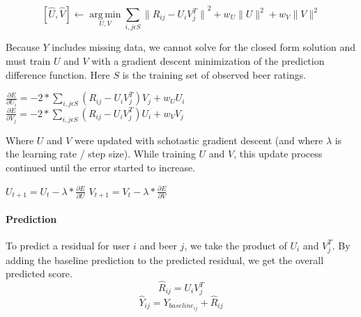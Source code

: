 \documentclass[12pt]{article}
\DeclareMathOperator*{\argmin}{arg\,min}
\begin{document}
$$ [\hat{U}, \hat{V}] \leftarrow \argmin\limits_{U,V}\sum\limits_{i,j \epsilon S} {\|R_{ij} - U_i V_j^T\|}^2 + w_U\|U\|^2 + w_V\|V\|^2$$

Because $Y$ includes missing data, we cannot solve for the closed form solution and must train $U$ and $V$ with a gradient descent minimization of the prediction difference function. Here $S$ is the training set of observed beer ratings. \\

\begin{center}
$ \frac{\partial E}{\partial U_i} = -2 * \sum\limits_{i,j \epsilon S} (R_{ij} - U_i V_j^T) V_j + w_U U_i $ \hspace{1cm} $ \frac{\partial E}{\partial V_j} = -2 * \sum\limits_{i,j \epsilon S} (R_{ij} - U_i V_j^T) U_i + w_V V_j$\\
\end{center}




Where $U$ and $V$ were updated with schotastic gradient descent (and where $\lambda$ is the learning rate / step size). While training $U$ and $V$, this update process continued until the error started to increase.
\begin{center}
$ U_{t+1} = U_t - \lambda * \frac{\partial E}{\partial U}$ \hspace{2cm} $V_{t+1} = V_t - \lambda * \frac{\partial E}{\partial V}$
\end{center}
\paragraph{Prediction} To predict a residual for user $i$ and beer $j$, we take the product of $U_i$ and $V_j^T$. By adding the baseline prediction to the predicted residual, we get the overall predicted score.
$$ \hat{R}_{ij} = U_i V_j^T $$
$$ \hat{Y}_{ij} = Y_{baseline_{ij}} + \hat{R}_{ij} $$
\end{document}
